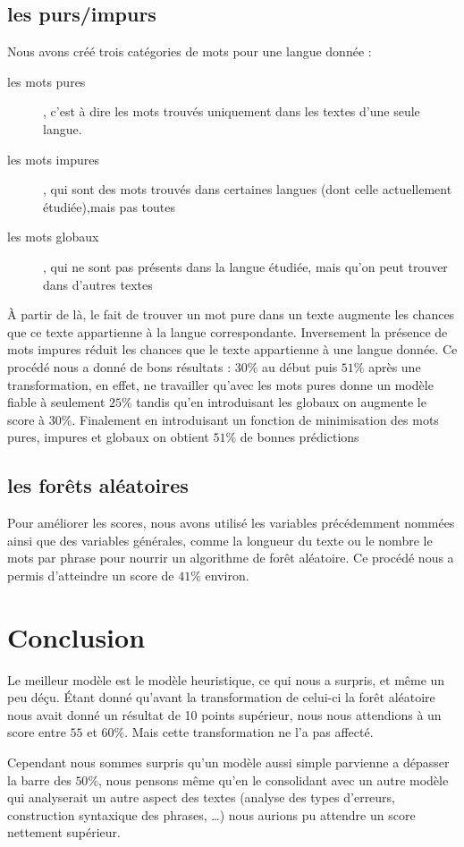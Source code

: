 \documentclass[a4paper]{article}
\begin{document}
\subsection{les purs/impurs}
Nous avons créé trois catégories de mots pour une langue donnée :
\begin{description}
\item[les mots pures], c'est à dire les mots trouvés uniquement dans
  les textes d'une seule langue.
\item[les mots impures], qui sont des mots trouvés dans certaines
  langues (dont celle actuellement étudiée),mais pas toutes
\item[les mots globaux], qui ne sont pas présents dans la langue
  étudiée, mais qu'on peut trouver dans d'autres textes
\end{description}
À partir de là, le fait de trouver un mot pure dans un texte augmente
les chances que ce texte appartienne à la langue correspondante.
Inversement la présence de mots impures réduit les chances que le
texte appartienne à une langue donnée.  Ce procédé nous a donné de
bons résultats : $30\%$ au début puis $51\%$ après une transformation,
en effet, ne travailler qu'avec les mots pures donne un modèle fiable
à seulement $25\%$ tandis qu'en introduisant les globaux on augmente
le score à $30\%$. Finalement en introduisant un fonction de
minimisation des mots pures, impures et globaux on obtient
$51\%$ de bonnes prédictions

\subsection{les forêts aléatoires}
Pour améliorer les scores, nous avons utilisé les variables
précédemment nommées ainsi que des variables générales, comme la
longueur du texte ou le nombre le mots par phrase pour nourrir un
algorithme de forêt aléatoire. Ce procédé nous a permis d'atteindre un
score de $41\%$ environ.
\section{Conclusion}
Le meilleur modèle est le modèle heuristique, ce qui nous a surpris,
et même un peu déçu. Étant donné qu'avant la transformation de
celui-ci la forêt aléatoire nous avait donné un résultat de 10 points
supérieur, nous nous attendions à un score entre $55$ et $60\%$. Mais
cette transformation ne l'a pas affecté.

Cependant nous sommes surpris qu'un modèle aussi simple parvienne a
dépasser la barre des $50\%$, nous pensons même qu'en le consolidant
avec un autre modèle qui analyserait un autre aspect des textes
(analyse des types d'erreurs, construction syntaxique des phrases, …)
nous aurions pu attendre un score nettement supérieur.
\end{document}
